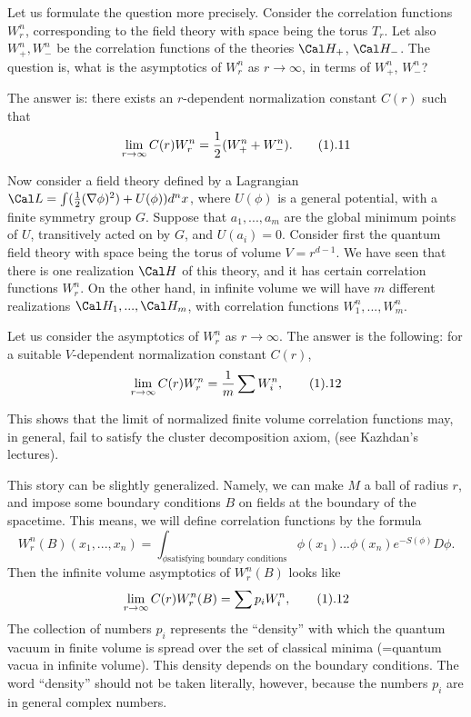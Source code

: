 Let us formulate the question more precisely. 
Consider the correlation functions $W^n_r$,
corresponding to the field theory with space being the torus $T_r$.
Let also $W_+^n,W_-^n$ be the correlation functions of the theories 
$\Cal H_+$, $\Cal H_-$. The question is, what is the asymptotics 
of $W^n_r$ as $r\to \infty$, in terms of $W_+^n$, $W_-^n$?

The answer is: there exists an $r$-dependent normalization constant 
$C(r)$ such that 
$$
\lim_{r\to \infty}C(r)W^n_r=\frac{1}{2}(W^n_++W^n_-).\tag 1.11
$$ 

Now consider a field theory defined by a 
Lagrangian $\Cal L=\int(\frac{1}{2}(\nabla\phi)^2)+U(\phi))d^nx$,
where $U(\phi)$ is a general potential, with a finite symmetry group $G$.  
Suppose that $a_1,...,a_m$ are the 
global minimum points of $U$, 
transitively acted on by $G$, and $U(a_i)=0$. Consider first the 
quantum field theory with space being the torus of volume $V=r^{d-1}$. 
We have seen that there is one realization $\Cal H$ of this theory, and it 
has certain correlation functions $W^n_r$. On the other hand, in infinite 
volume we will have $m$ different realizations $\Cal H_1,...,\Cal H_m$, 
with correlation functions $W^n_1,...,W^n_m$. 

Let us consider the asymptotics of $W^n_r$ as $r\to \infty$. 
The answer is the following: for a suitable 
$V$-dependent normalization constant $C(r)$, 
$$
\lim_{r\to \infty}C(r)W^n_r=\frac{1}{m}\sum W^n_i,\tag 1.12
$$

This 
shows that the limit of normalized 
finite volume correlation functions may, in general,
fail to satisfy the cluster decomposition axiom, 
(see Kazhdan's lectures). 

This story can be slightly generalized. Namely, we can make $M$ a ball 
of radius $r$, and impose some boundary conditions $B$ on 
fields at the boundary of the spacetime. This means, we will define 
correlation functions by the formula
$$
W_r^n(B)(x_1,...,x_n)=\int_{\phi \text{satisfying boundary
conditions}}\phi(x_1)...\phi(x_n)e^{-S(\phi)}D\phi.
$$ 
Then the infinite volume asymptotics of $W^n_r(B)$ looks like
$$
\lim_{r\to \infty}C(r)W^n_r(B)=\sum p_iW^n_i,\tag 1.12
$$
The collection of numbers $p_i$ represents 
the ``density'' with which the quantum vacuum in finite volume is
spread over the set of classical minima (=quantum vacua in 
infinite volume). This density depends on the boundary conditions. 
The word ``density'' should not be taken literally,
however, because the numbers $p_i$ are in general complex numbers. 

